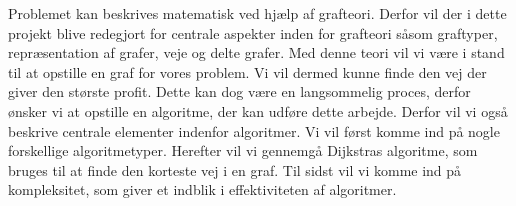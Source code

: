 Problemet kan beskrives matematisk ved hjælp af grafteori. Derfor vil der i dette projekt blive redegjort for centrale aspekter inden for grafteori såsom graftyper, repræsentation af grafer, veje og delte grafer. Med denne teori vil vi være i stand til at opstille en graf for vores problem. Vi vil dermed kunne finde den vej der giver den største profit. 
Dette kan dog være en langsommelig proces, derfor ønsker vi at opstille en algoritme, der kan udføre dette arbejde. Derfor vil vi også beskrive centrale elementer indenfor algoritmer. Vi vil først komme ind på nogle forskellige algoritmetyper. Herefter vil vi gennemgå Dijkstras algoritme, som bruges til at finde den korteste vej i en graf. Til sidst vil vi komme ind på kompleksitet, som giver et indblik i effektiviteten af algoritmer.




